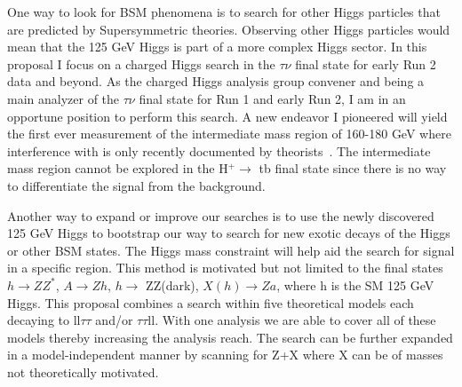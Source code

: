 \documentclass[11pt]{article}
\begin{document}
One way to look for BSM phenomena is to search for other Higgs particles that are predicted by Supersymmetric theories.  Observing other Higgs particles would mean that the 125 GeV Higgs is part of a more complex Higgs sector.
In this proposal I focus on a charged Higgs search in the $\tau \nu$ final state for early Run 2 data and beyond. As the charged Higgs analysis group convener and being a main analyzer of the $\tau \nu$ final state for Run 1 and early Run 2, I am in an
opportune position to perform this search.  A new endeavor I pioneered will yield the first ever measurement of the intermediate mass region of 160-180 GeV where interference with \ttbar is only recently documented by theorists~\cite{intermediate}.
The intermediate mass region cannot be explored in the H$^+ \rightarrow$ tb final state since there is no way to differentiate the signal from the \ttbar background.

Another way to expand or improve our searches is to use the newly discovered 125 GeV Higgs to bootstrap our way to search for new exotic decays of the Higgs or other BSM states.  
The Higgs mass constraint will help aid the search for signal in a specific region.  %
This method is motivated but not limited to the final states $h\rightarrow ZZ^*$, $A \rightarrow Zh$, $h \rightarrow$ ZZ(dark), $X(h) \rightarrow  Za$, where h is the SM 125 GeV Higgs. 
This proposal combines a search within five theoretical models each decaying to ll$\tau\tau$ and/or $\tau\tau$ll.  With one analysis we are able to
cover all of these models thereby increasing the analysis reach.  The search can be further expanded in a model-independent manner by scanning for Z+X where X can be of masses not theoretically motivated. 
\end{document}
